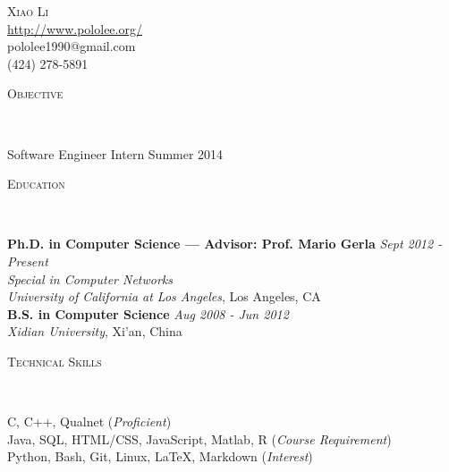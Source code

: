 \documentclass[9pt]{article}
\newenvironment{changemargin}[2]{%
  \begin{list}{}{%
    \setlength{\topsep}{0pt}%
    \setlength{\leftmargin}{#1}%
    \setlength{\rightmargin}{#2}%
    \setlength{\listparindent}{\parindent}%
    \setlength{\itemindent}{\parindent}%
    \setlength{\parsep}{\parskip}%
  }%
  \item[]}{\end{list}
}
\newcommand{\lineover}{
	\begin{changemargin}{-0.05in}{-0.05in}
		\vspace*{-8pt}
		\hrulefill \\
		\vspace*{-2pt}
	\end{changemargin}
}
\newcommand{\header}[1]{
	\begin{changemargin}{-0.5in}{-0.5in}
		\scshape{#1}\\
  	\lineover
	\end{changemargin}
}
\newcommand{\contact}[4]{
	\begin{changemargin}{-0.5in}{-0.5in}
		\begin{center}
			{\Large \scshape {#1}}\\ \smallskip
			{#2}\\ \smallskip 
			{#3}\\ \smallskip
			{#4}\smallskip
		\end{center}
	\end{changemargin}
}
\newenvironment{body} {
	\vspace*{-16pt}
	\begin{changemargin}{-0.25in}{-0.5in}
  }	
	{\end{changemargin}
}
\begin{document}
\contact{Xiao Li}{\href{http://www.pololee.org}{http://www.pololee.org/}}{pololee1990@gmail.com}{(424) 278-5891}


\header{Objective}

\begin{body}
	\vspace{14pt}
	Software Engineer Intern Summer 2014
\end{body}

\smallskip


\header{Education}

\begin{body}
	\vspace{14pt}
	\textbf{Ph.D. in Computer Science --- Advisor: Prof. Mario Gerla} 
	{}\hfill \emph{Sept 2012 - Present}{} \\
	\emph{Special in Computer Networks}\\
	\emph{University of California at Los Angeles}, Los Angeles, CA{} \\
  \medskip
	\textbf{B.S. in Computer Science} \hfill \emph{Aug 2008 - Jun 2012} \\
	\emph{Xidian University}, Xi'an, China\\
\end{body}

\smallskip



\header{ Technical Skills}

\begin{body}
	\vspace{14pt}
	C, C++, Qualnet (\emph{Proficient})\\
	\smallskip
	Java, SQL, HTML/CSS, JavaScript, Matlab, R (\emph{Course Requirement})\\
	\smallskip
	Python, Bash, Git, Linux, \LaTeX, Markdown  (\emph{Interest}) \\
\end{body}
\end{document}
